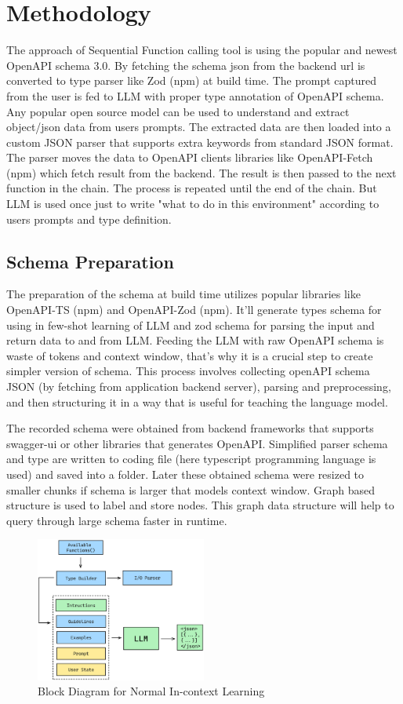 \documentclass[conference]{IEEEtran}
\begin{document}
\section{Methodology}
The approach of Sequential Function calling tool is using the popular and newest OpenAPI schema 3.0. By fetching the schema json from the backend url is converted to type parser like Zod (npm) at build time. The prompt captured from the user is fed to LLM with proper type annotation of OpenAPI schema. Any popular open source model can be used to understand and extract object/json data from users prompts. The extracted data are then loaded into a custom JSON parser that supports extra keywords from standard JSON format. The parser moves the data to OpenAPI clients libraries like OpenAPI-Fetch (npm) which fetch result from the backend. The result is then passed to the next function in the chain. The process is repeated until the end of the chain. But LLM is used once just to write "what to do in this environment" according to users prompts and type definition.

\subsection{Schema Preparation}\label{AA}
The preparation of the schema at build time utilizes popular libraries like OpenAPI-TS (npm) and OpenAPI-Zod (npm). It'll generate types schema for using in few-shot learning of LLM and zod schema for parsing the input and return data to and from LLM. Feeding the LLM with raw OpenAPI schema is waste of tokens and context window, that's why it is a crucial step to create simpler version of schema. This process involves collecting openAPI schema JSON (by fetching from application backend server), parsing and preprocessing, and then structuring it in a way that is useful for teaching the language model. 

The recorded schema were obtained from backend frameworks that supports swagger-ui or other libraries that generates OpenAPI. Simplified parser schema and type are written to coding file (here typescript programming language is used) and saved into a folder. Later these obtained schema were resized to smaller chunks if schema is larger that models context window. Graph based structure is used to label and store nodes. This graph data structure will help to query through large schema faster in runtime. 

\begin{figure}[htbp]
    \centering
    \includegraphics[width=0.5\textwidth]{images/without-finetuning.png}  
    \caption{Block Diagram for Normal In-context Learning}
    \label{fig}
\end{figure}
\end{document}
